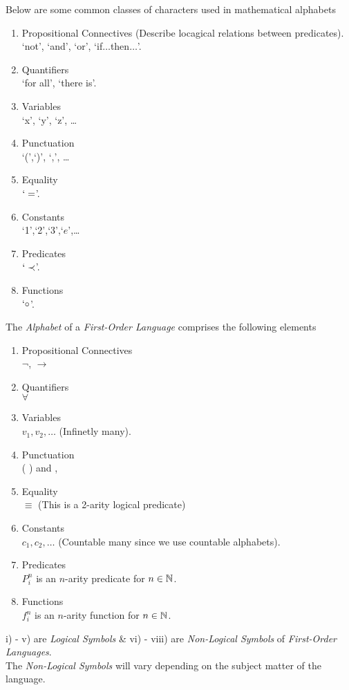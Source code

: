 \documentclass[11pt,a4paper]{article}
\begin{document}
Below are some common classes of characters used in mathematical alphabets
\begin{enumerate}
	\item Propositional Connectives (Describe locagical relations between predicates). \\
	`not', `and', `or', `if$\dots$then$\dots$'.
	\item Quantifiers\\
	`for all', `there is'.
	\item Variables\\
	`x', `y', `z', \dots
	\item Punctuation\\
	`(',`)', `,', \dots
	\item Equality\\
	$`=$'.
	\item Constants\\
	`1',`2',`3',`$e$',\dots
	\item Predicates\\
	$`\prec$'.
	\item Functions\\
	$`\circ$'.
\end{enumerate}

The \textit{Alphabet} of a \textit{First-Order Language} comprises the following elements
\begin{enumerate}
	\item Propositional Connectives\\
	$\neg$, $\to$
	\item Quantifiers\\
	$\forall$
	\item Variables\\
	$v_1,v_2,\dots$ (Infinetly many).
	\item Punctuation\\
	( ) and ,
	\item Equality\\
	$\equiv$ (This is a 2-arity logical predicate)
	\item Constants\\
	$c_1,c_2,\dots$ (Countable many since we use countable alphabets).
	\item Predicates\\
	$P_i^n$ is an $n$-arity predicate for $n\in\mathbb{N}$.
	\item Functions\\
	$f_i^n$ is an $n$-arity function for $n\in\mathbb{N}$.
\end{enumerate}
i) - v) are \textit{Logical Symbols} \& vi) - viii) are \textit{Non-Logical Symbols} of \textit{First-Order Languages}.\\
The \textit{Non-Logical Symbols} will vary depending on the subject matter of the language.\\
\end{document}
